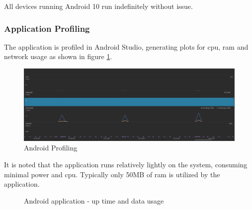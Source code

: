 All devices running Android 10 run indefinitely without issue.

\subsubsection{Application Profiling}
The application is profiled in Android Studio, generating plots for \ac{cpu}, \ac{ram} and network usage as shown in figure \ref{fig:android_profiling}.
\begin{figure}[H]
\centering
\includegraphics[width=6in]{android_profiling.png}
\caption{Android Profiling}
\label{fig:android_profiling}
\end{figure}
It is noted that the application runs relatively lightly on the system, consuming minimal power and \ac{cpu}.
Typically only 50MB of \ac{ram} is utilized by the application.

\begin{figure}
\centering
\caption{Android application - up time and data usage}
\label{fig:performance}
\end{figure}

